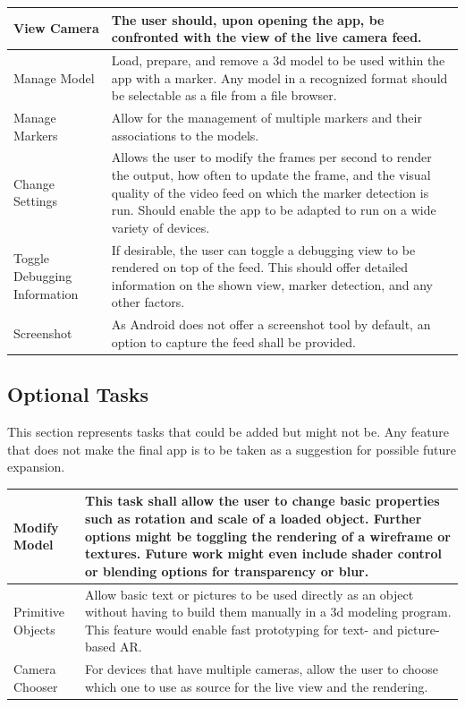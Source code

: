 \begin{tabulary}{\textwidth}{L || L}
View Camera & The user should, upon opening the app, be confronted with the view of the live camera feed.\\
\hline
Manage Model & Load, prepare, and remove a 3d model to be used within the app with a marker. Any model in a recognized format should be selectable as a file from a file browser. \\
\hline
Manage Markers & Allow for the management of multiple markers and their associations to the models. \\
\hline
Change Settings & Allows the user to modify the frames per second to render the output, how often to update the frame, and the visual quality of the video feed on which the marker detection is run. Should enable the app to be adapted to run on a wide variety of devices.\\
\hline
Toggle Debugging Information & If desirable, the user can toggle a debugging view to be rendered on top of the feed. This should offer detailed information on the shown view, marker detection, and any other factors. \\
\hline
Screenshot & As Android does not offer a screenshot tool by default, an option to capture the feed shall be provided. \\
\end{tabulary}

\subsection{Optional Tasks}

This section represents tasks that could be added but might not be.
Any feature that does not make the final app is to be taken as a suggestion for possible future expansion.

\begin{tabulary}{\textwidth}{L || L}
Modify Model & This task shall allow the user to change basic properties such as rotation and scale of a loaded object. Further options might be toggling the rendering of a wireframe or textures. Future work might even include shader control or blending options for transparency or blur.\\
\hline
Primitive Objects & Allow basic text or pictures to be used directly as an object without having to build them manually in a 3d modeling program. This feature would enable fast prototyping for text- and picture-based AR.\\
\hline
Camera Chooser & For devices that have multiple cameras, allow the user to choose which one to use as source for the live view and the rendering.\\
\end{tabulary}

